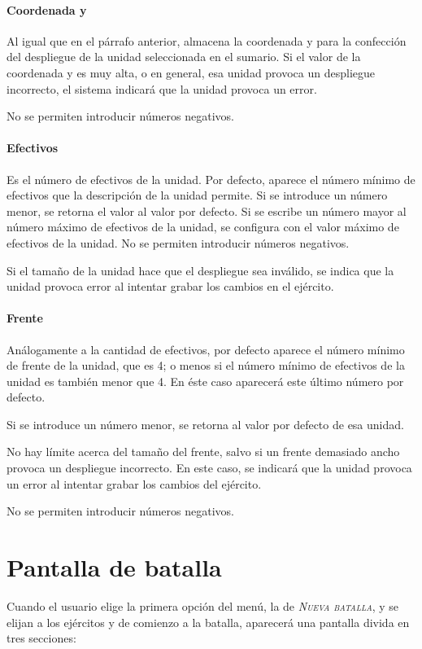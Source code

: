 \paragraph{Coordenada y}
Al igual que en el párrafo anterior, almacena la coordenada y para la
confección del despliegue de la unidad seleccionada en el sumario. Si
el valor de la coordenada y es muy alta, o en general, esa unidad
provoca un despliegue incorrecto, el sistema
indicará que la unidad provoca un error.

No se permiten introducir números negativos.

\paragraph{Efectivos}
Es el número de efectivos de la unidad. Por defecto, aparece el número
mínimo de efectivos que la descripción de la unidad permite. Si se
introduce un número menor, se retorna el valor al valor por
defecto. Si se escribe un número mayor al número máximo de efectivos
de la unidad, se configura con el valor máximo de efectivos de la
unidad. No se permiten introducir números negativos.

Si el tamaño de la unidad hace que el despliegue sea inválido, se
indica que la unidad provoca error al intentar grabar los cambios en
el ejército.

\paragraph{Frente}
Análogamente a la cantidad de efectivos, por defecto aparece el número
mínimo de frente de la unidad, que es 4; o menos si el número mínimo
de efectivos de la unidad es también menor que 4. En éste caso
aparecerá este último número por defecto.

Si se introduce un número menor, se retorna al valor por defecto de
esa unidad.

No hay límite acerca del tamaño del frente, salvo si un frente
demasiado ancho provoca un despliegue incorrecto. En este caso, se
indicará que la unidad provoca un error al intentar grabar los cambios
del ejército.

No se permiten introducir números negativos.

\section*{Pantalla de batalla}
Cuando el usuario elige la primera opción del menú, la de
\textsc{\textit{Nueva batalla}}, y se elijan a los ejércitos y de
comienzo a la batalla, aparecerá una pantalla divida en tres
secciones:


